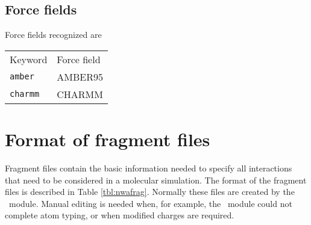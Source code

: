 \subsection{Force fields}
\label{sec:nwaforcefields}
Force fields recognized are
\begin{center}
\begin{tabular}{ll}
\hline
Keyword      & Force field   \\
{\tt amber}  & AMBER95       \\
{\tt charmm} & CHARMM        \\
\hline
\end{tabular}
\end{center}  

\section{Format of fragment files}
Fragment files contain the basic information needed to specify all
interactions that need to be considered in a molecular simulation.
The format of the fragment files is described in Table \ref{tbl:nwafrag}.
Normally these files are created by the \prepare\ module. Manual
editing is needed when, for example, the \prepare\ module could not
complete atom typing, or when modified charges are required. 

